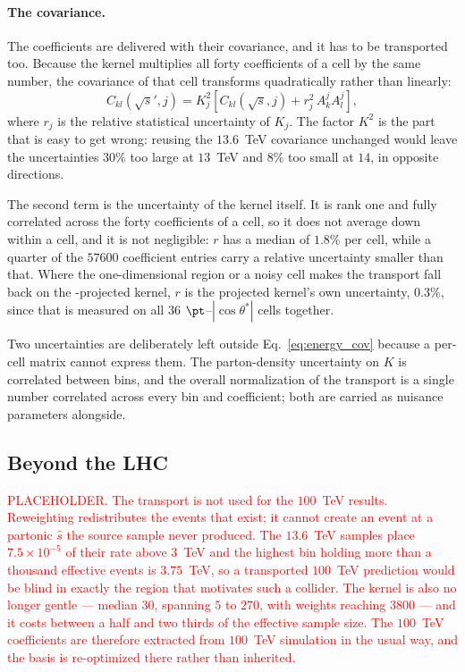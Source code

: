 \paragraph{The covariance.}
The coefficients are delivered with their covariance, and it has to be transported
too. Because the kernel multiplies all forty coefficients of a cell by the same
number, the covariance of that cell transforms quadratically rather than linearly:
%
\begin{equation}
C_{kl}(\sqrt{s}',j) = K_j^2 \left[ C_{kl}(\sqrt{s},j)
                      + r_j^2\, A_k^j A_l^j \right] ,
\label{eq:energy_cov}
\end{equation}
%
where $r_j$ is the relative statistical uncertainty of $K_j$. The factor $K^2$ is the
part that is easy to get wrong: reusing the $13.6$~TeV covariance unchanged would
leave the uncertainties $30\%$ too large at $13$~TeV and $8\%$ too small at $14$, in
opposite directions.

The second term is the uncertainty of the kernel itself. It is rank one and fully
correlated across the forty coefficients of a cell, so it does not average down
within a cell, and it is not negligible: $r$ has a median of $1.8\%$ per cell, while
a quarter of the $57600$ coefficient entries carry a relative uncertainty smaller than
that. Where the one-dimensional region or a noisy cell makes the transport fall back on
the \mHH-projected kernel, $r$ is the projected kernel's own uncertainty, $0.3\%$,
since that is measured on all $36$ $\pt$--$|\cos\theta^*|$ cells together.

Two uncertainties are deliberately left outside Eq.~\eqref{eq:energy_cov} because a
per-cell matrix cannot express them. The parton-density uncertainty on $K$ is
correlated between bins, and the overall normalization of the transport is a single
number correlated across every bin and coefficient; both are carried as nuisance
parameters alongside.

\subsection{Beyond the LHC}
\label{sec:energy_beyond}

\textcolor{red}{PLACEHOLDER. The transport is not used for the $100$~TeV results.
Reweighting redistributes the events that exist; it cannot create an event at a partonic $\hat{s}$ the source sample
never produced. The $13.6$~TeV samples place $7.5\times 10^{-5}$ of their rate above
$3$~TeV and the highest bin holding more than a thousand effective events is
$3.75$~TeV, so a transported $100$~TeV prediction would be blind in exactly the region
that motivates such a collider. The kernel is also no longer gentle --- median $30$,
spanning $5$ to $270$, with weights reaching $3800$ --- and it costs between a half and
two thirds of the effective sample size. The $100$~TeV coefficients are therefore
extracted from $100$~TeV simulation in the usual way, and the basis is re-optimized
there rather than inherited.}
